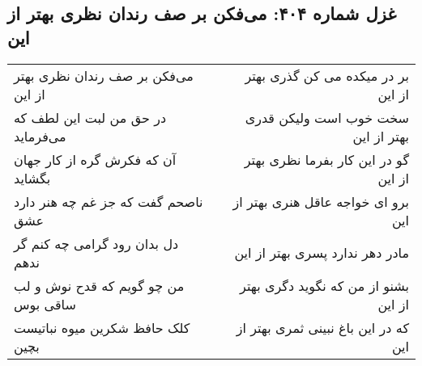\begin{center}
\section*{غزل شماره ۴۰۴: می‌فکن بر صف رندان نظری بهتر از این}
\label{sec:sh404}
\begin{longtable}{l p{0.5cm} r}
می‌فکن بر صف رندان نظری بهتر از این
&&
بر در میکده می کن گذری بهتر از این
\\
در حق من لبت این لطف که می‌فرماید
&&
سخت خوب است ولیکن قدری بهتر از این
\\
آن که فکرش گره از کار جهان بگشاید
&&
گو در این کار بفرما نظری بهتر از این
\\
ناصحم گفت که جز غم چه هنر دارد عشق
&&
برو ای خواجه عاقل هنری بهتر از این
\\
دل بدان رود گرامی چه کنم گر ندهم
&&
مادر دهر ندارد پسری بهتر از این
\\
من چو گویم که قدح نوش و لب ساقی بوس
&&
بشنو از من که نگوید دگری بهتر از این
\\
کلک حافظ شکرین میوه نباتیست بچین
&&
که در این باغ نبینی ثمری بهتر از این
\\
\end{longtable}
\end{center}
